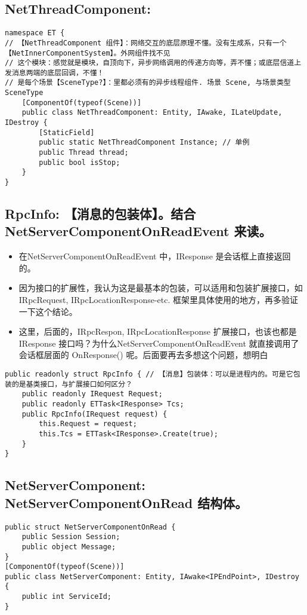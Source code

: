 \documentclass[9pt, b5paper]{article}
\begin{document}
\subsection{NetThreadComponent:}
\label{sec-6-1}
\begin{verbatim}
namespace ET {
// 【NetThreadComponent 组件】：网络交互的底层原理不懂。没有生成系，只有一个【NetInnerComponentSystem】。外网组件找不见
// 这个模块：感觉就是模块，自顶向下，异步网络调用的传递方向等，弄不懂；或底层信道上发消息两端的底层回调，不懂！
// 是每个场景【SceneType?】：里都必须有的异步线程组件. 场景 Scene, 与场景类型SceneType
    [ComponentOf(typeof(Scene))] 
    public class NetThreadComponent: Entity, IAwake, ILateUpdate, IDestroy {
        [StaticField]
        public static NetThreadComponent Instance; // 单例
        public Thread thread;
        public bool isStop;
    }
}
\end{verbatim}
\subsection{RpcInfo: 【消息的包装体】。结合NetServerComponentOnReadEvent 来读。}
\label{sec-6-2}
\begin{itemize}
\item 在NetServerComponentOnReadEvent 中，IResponse 是会话框上直接返回的。
\item 因为接口的扩展性，我认为这是最基本的包装，可以适用和包装扩展接口，如IRpcRequest, IRpcLocationResponse-etc. 框架里具体使用的地方，再多验证一下这个结论。
\item 这里，后面的，IRpcRespon, IRpcLocationResponse 扩展接口，也该也都是 IResponse 接口吗？为什么NetServerComponentOnReadEvent 就直接调用了会话框层面的 OnResponse() 呢。后面要再去多想这个问题，想明白
\end{itemize}
\begin{verbatim}
public readonly struct RpcInfo { // 【消息】包装体：可以是进程内的。可是它包装的是基类接口，与扩展接口如何区分？
    public readonly IRequest Request;
    public readonly ETTask<IResponse> Tcs;
    public RpcInfo(IRequest request) {
        this.Request = request;
        this.Tcs = ETTask<IResponse>.Create(true);
    }
}
\end{verbatim}
\subsection{NetServerComponent: NetServerComponentOnRead 结构体。}
\label{sec-6-3}
\begin{verbatim}
public struct NetServerComponentOnRead {
    public Session Session;
    public object Message;
}
[ComponentOf(typeof(Scene))]
public class NetServerComponent: Entity, IAwake<IPEndPoint>, IDestroy {
    public int ServiceId;
}
\end{verbatim}
\end{document}
